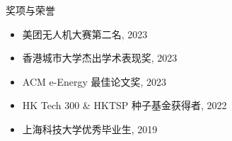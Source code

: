 \documentclass{resume} %
\begin{document}
\begin{rSection}{奖项与荣誉}
    \begin{itemize}
        \item 美团无人机大赛第二名, 2023
        \item 香港城市大学杰出学术表现奖, 2023
        \item ACM e-Energy 最佳论文奖, 2023
        \item HK Tech 300 \& HKTSP 种子基金获得者, 2022
        \item 上海科技大学优秀毕业生, 2019
    \end{itemize}
    
\end{rSection}





\end{document}
